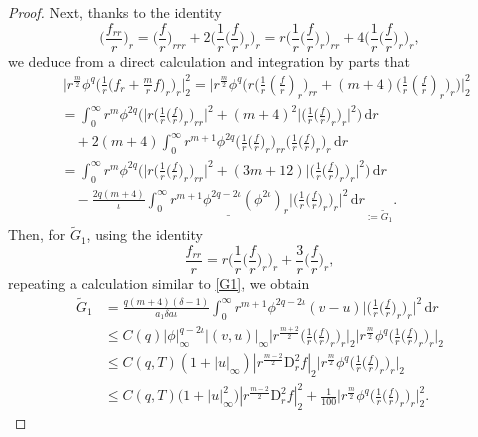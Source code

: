 \documentclass[11pt,reqno]{amsart}
\numberwithin{rk}{section}
\numberwithin{prop}{section}
\numberwithin{mydef}{section}
\numberwithin{lem}{section}
\numberwithin{equation}{section}
\numberwithin{thm}{section}
\begin{document}
\begin{proof}
Next, thanks to the identity
\begin{equation}\label{L6''}
\big(\frac{f_{rr}}{r}\big)_r=\big(\frac{f}{r}\big)_{rrr}+2\Big(\frac{1}{r}\big(\frac{f}{r}\big)_r\Big)_r= r \Big(\frac{1}{r}\big(\frac{f}{r}\big)_r\Big)_{rr}+4 \Big(\frac{1}{r}\big(\frac{f}{r}\big)_r\Big)_r,
\end{equation}
we deduce from a direct calculation and integration by parts that
\begin{equation}\label{9.6}
\begin{aligned}
&\,\Big|r^\frac{m}{2}\phi^q \Big(\frac{1}{r}\big(f_r+ \frac{m}{r}f\big)_r\Big)_r\Big|_2^2=\Big|r^\frac{m}{2}\phi^{q}\Big(r\big(\frac{1}{r}(\frac{f}{r})_r\big)_{rr}+(m+4) \big(\frac{1}{r}(\frac{f}{r})_r\big)_r\Big)\Big|_2^2\\
&=\int_0^\infty  r^m\phi^{2q} \Big(\Big|r\Big(\frac{1}{r}\big(\frac{f}{r}\big)_r\Big)_{rr}\Big|^2 +(m+4)^2 \Big|\Big(\frac{1}{r}\big(\frac{f}{r}\big)_r\Big)_r\Big|^2\Big)\,\mathrm{d}r\\
&\quad +2(m+4)\int_0^\infty  r^{m+1}\phi^{2q} \Big(\frac{1}{r}\big(\frac{f}{r}\big)_r\Big)_{rr} \Big(\frac{1}{r}\big(\frac{f}{r}\big)_r\Big)_r\,\mathrm{d}r\\
&=\int_0^\infty  r^m\phi^{2q} \Big(\Big|r\Big(\frac{1}{r}\big(\frac{f}{r}\big)_r\Big)_{rr}\Big|^2 +(3m+12)\Big|\Big(\frac{1}{r}\big(\frac{f}{r}\big)_r\Big)_r\Big|^2\Big)\,\mathrm{d}r\\
&\quad -\underline{\frac{2q(m+4)}{\iota}\int_0^\infty r^{m+1}\phi^{2q-2\iota}(\phi^{2\iota})_r\Big|\Big(\frac{1}{r}\big(\frac{f}{r}\big)_r\Big)_r\Big|^2 \,\mathrm{d}r}_{:=\widetilde G_1}.
\end{aligned}
\end{equation}
Then, for $\widetilde G_1$, using the identity
\begin{equation*}
\frac{f_{rr}}{r}=r\Big(\frac{1}{r}\big(\frac{f}{r}\big)_{r}\Big)_r+\frac{3}{r}\big(\frac{f}{r}\big)_r,
\end{equation*}
repeating a calculation similar to \eqref{G1}, we obtain
\begin{equation*} 
\begin{aligned}
\widetilde G_1&=\frac{q(m+4)(\delta-1)}{a_1\delta a\iota}\int_0^\infty r^{m+1}\phi^{2q-2\iota}(v-u)\Big|\Big(\frac{1}{r}\big(\frac{f}{r}\big)_r\Big)_r\Big|^2 \,\mathrm{d}r\\
&\leq C(q)|\phi|_\infty^{q-2\iota}|(v,u)|_\infty \Big|r^\frac{m+2}{2}\Big(\frac{1}{r}\big(\frac{f}{r}\big)_r\Big)_r\Big|_2\Big|r^\frac{m}{2}\phi^q \Big(\frac{1}{r}\big(\frac{f}{r}\big)_r\Big)_r\Big|_2\\
&\leq C(q,T)(1+|u|_\infty) |r^\frac{m-2}{2}\mathrm{D}_r^2 f|_2\Big|r^\frac{m}{2}\phi^q \Big(\frac{1}{r}\big(\frac{f}{r}\big)_r\Big)_r\Big|_2\\
&\leq C(q,T)\big(1+|u|_\infty^2\big)|r^\frac{m-2}{2}\mathrm{D}_r^2 f|_2^2+\frac{1}{100}\Big|r^\frac{m}{2}\phi^q \Big(\frac{1}{r}\big(\frac{f}{r}\big)_r\Big)_r\Big|_2^2.
\end{aligned}
\end{equation*}



\end{proof}
\end{document}
